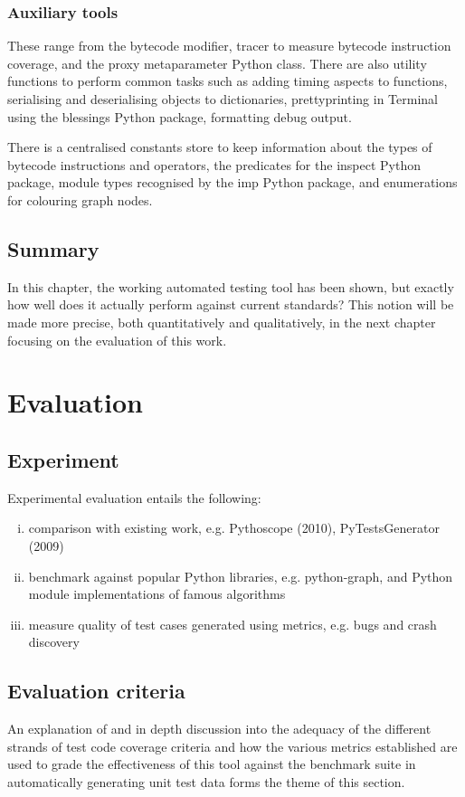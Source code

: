 \documentclass{icldt}
\numberwithin{equation}{section}       %
\newcommand{\blankpage}{
\newpage
\thispagestyle{empty}
\mbox{}
\newpage
}
\begin{document}
{{\subsection{Auxiliary tools}
These range from the bytecode modifier, tracer to measure bytecode instruction coverage,  and the proxy metaparameter Python class. There are also utility functions to perform common tasks such as adding timing aspects to functions, serialising and deserialising objects to dictionaries, prettyprinting in Terminal using the \textsf{blessings} Python package, formatting debug output.

There is a centralised constants store to keep information about the types of bytecode instructions and operators, the predicates for the \textsf{inspect} Python package, module types recognised by the \textsf{imp} Python package, and enumerations for colouring graph nodes.

\section{Summary}
In this chapter, the working automated testing tool has been shown, but exactly how well does it actually perform against current standards? This notion will be made more precise, both quantitatively and qualitatively, in the next chapter focusing on the evaluation of this work.
\chapter{Evaluation}
\label{ch:eval}
\section{Experiment}
Experimental evaluation entails the following:
\begin{enumerate}[i.]
	\item comparison with existing work, e.g. Pythoscope (2010), PyTestsGenerator (2009)
	\item benchmark against popular Python libraries, e.g. python-graph, and Python module implementations of famous algorithms
	\item measure quality of test cases generated using metrics, e.g. bugs and crash discovery
\end{enumerate}

\section{Evaluation criteria}
An explanation of and in depth discussion into the adequacy of the different strands of test code coverage criteria and how the various metrics established are used to grade the effectiveness of this tool against the benchmark suite in automatically generating unit test data forms the theme of this section.

}}
\end{document}
